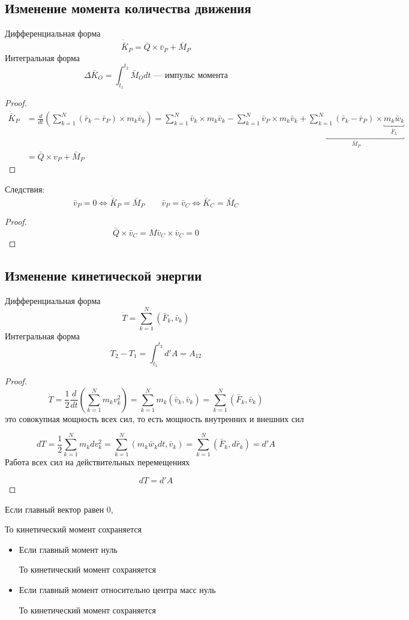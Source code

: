 \documentclass[crop=false]{standalone}
\begin{document}
\subsection{Изменение момента количества движения}
Дифференциальная форма
\[\dot {\bar K}_P  = \bar Q \times \bar v_P + \bar M_P\]
Интегральная форма
\[\Delta \bar K_O = \int_{t_1}^{t_2} \bar M_O dt \text{ — импульс момента}\]
\begin{proof}
    \[
        \begin{aligned}
            \dot{\bar K}_P &= \frac{d}{d t}\left(\sum_{k=1}^{N} (\bar r_k - \bar r_P) \times m_k \bar v_k \right)
            = \sum_{k=1}^N \bar v_k \times m_k \bar v_k - \sum_{k=1}^N \bar v_P \times m_k \bar v_k  + \underbracket{\sum_{k=1}^{N} (\bar r_k - \bar r_P) \times \underbracket{m_k \bar w_k}_{\bar F_k}}_{\bar M_P}
            \\ &= \bar Q \times v_P + \bar M_P
        \end{aligned}
        \]
\end{proof}
Следствия:        
        \[\bar v_P = 0 \iff \dot {\bar K}_P = \bar M_P  \qquad \bar v_P = \bar v_C \iff \dot{\bar K}_C = \bar M_C\]
        \begin{proof}
            \[\bar Q \times \bar v_C = M \bar v_C \times \bar v_C = 0\]
        \end{proof}

\subsection{Изменение кинетической энергии}
Дифференциальная форма
\[\dot T = \sum_{k=1}^N(\bar F_k, \bar v_k)\]
Интегральная форма
\[T_2 - T_1 = \int_{t_1}^{t_2} d' A = A_{1 2}\]
\begin{proof}
\[\dot T = \frac{1}{2} \frac{d}{d t}\left(\sum_{k=1}^N m_k v_k^2\right) = \sum_{k=1}^N m_k (\dot{\bar v}_k, \bar v_k)  = \sum_{k=1}^N (\bar F_k, \bar v_k)\]
это совокупная мощность всех сил, то есть мощность внутренних и внешних сил

\[d T = \frac{1}{2} \sum_{k=1}^N m_k d v_k^2 = \sum_{k=1}^N (m_k \bar w_k d t, \bar v_k) = \sum_{k=1}^N (\bar F_k , d \bar r_k) = d' A\]
Работа всех сил на действительных перемещениях

\[d T = d' A\]
\end{proof}
\begin{theorem}
Если главный вектор равен 0, 

То кинетический момент сохраняется
\end{theorem}

\begin{theorem}
    \begin{itemize}
        \item 
        Если главный момент нуль
        
        То кинетический момент сохраняется
        
        \item
        Если главный момент относительно центра масс нуль
        
        То кинетический момент сохраняется
    \end{itemize}
\end{theorem}
\end{document}
